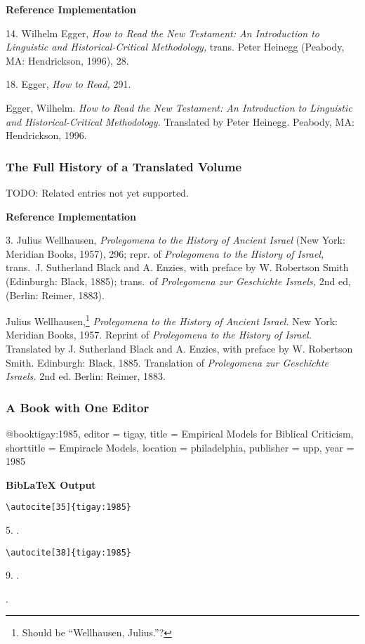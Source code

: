 \documentclass[a4paper]{article}
\newcommand\citetest[5]{%
  {\textbf{BibLaTeX Output}\par
   \nobreak
   \texttt{\textbackslash autocite[#2]\{#5\}}\par
   \color{biblatex-colour}
   #1. \cite[#2]{#5}.\par
   \color{black}
   \texttt{\textbackslash autocite[#4]\{#5\}}\par
   \color{biblatex-colour}
   #3. \cite[#4]{#5}.\par
   \hangindent\bibindent\bibentrycite{#5}.\par}}
\newenvironment{refimp}{%
  \begin{minipage}{\linewidth}
    \setlength{\parskip}{1ex}
    \textbf{Reference Implementation}\par
    \nobreak
    \color{reference-colour}
}{\end{minipage}}
\newenvironment{vb}{%
  \setlength{\parskip}{0pt}
  \verbatim}{\endverbatim}
\begin{document}
\begin{refimp}
  14. Wilhelm Egger, \emph{How to Read the New Testament: An Introduction to
  Linguistic and Historical-Critical Methodology,} trans. Peter Heinegg
  (Peabody, MA: Hendrickson, 1996), 28.

  18. Egger, \emph{How to Read,} 291.
  
  \hangindent\bibindent Egger, Wilhelm. \emph{How to Read the New Testament:
  An Introduction to Linguistic and Historical-Critical Methodology.}
  Translated by Peter Heinegg. Peabody, MA: Hendrickson, 1996.
\end{refimp}

\subsubsection{The Full History of a Translated Volume}

TODO: Related entries not yet supported.

\begin{refimp}
  3. Julius Wellhausen, \emph{Prolegomena to the History of Ancient Israel}
  (New York: Meridian Books, 1957), 296; repr. of \emph{Prolegomena to the
  History of Israel,} trans.\ J. Sutherland Black and A. Enzies, with preface
  by W. Robertson Smith (Edinburgh: Black, 1885); trans.\ of \emph{Prolegomena
  zur Geschichte Israels,} 2nd ed, (Berlin: Reimer, 1883).

  \hangindent\bibindent Julius Wellhausen,\footnote{Should be “Wellhausen,
  Julius.”?} \emph{Prolegomena to the History of Ancient Israel.} New York:
  Meridian Books, 1957. Reprint of \emph{Prolegomena to the History of
  Israel.} Translated by J. Sutherland Black and A. Enzies, with preface by W.
  Robertson Smith. Edinburgh: Black, 1885. Translation of \emph{Prolegomena
  zur Geschichte Israels.} 2nd ed. Berlin: Reimer, 1883.
\end{refimp}

\subsubsection{A Book with One Editor}

\begin{vb}
@book{tigay:1985,
  editor = tigay,
  title = {Empirical Models for Biblical Criticism},
  shorttitle = {Empiracle Models},
  location = philadelphia,
  publisher = upp,
  year = {1985}
}
\end{vb}  

\citetest{5}{35}{9}{38}{tigay:1985}
\end{document}
